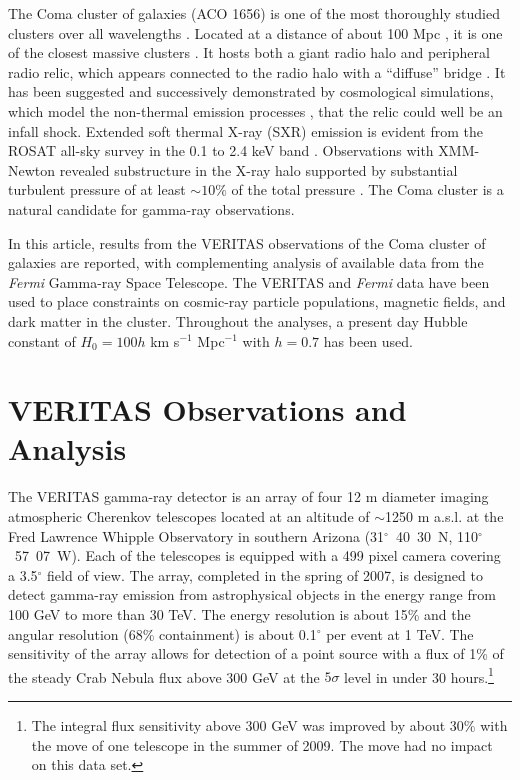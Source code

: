 \documentclass[12pt,manuscript]{aastex}
\def\Fermi{{\em Fermi}\xspace}
\begin{document}
The Coma cluster of galaxies (ACO 1656) is one of the most thoroughly studied clusters over all
wavelengths \citep{article:Voges_etal:1999}. Located at a distance of about 100 Mpc
\citep[$z=0.023$;][]{article:StrubleRood:1999}, it is one of the closest massive clusters \citep[$M
\sim10^{15}M_{\odot}$;][]{article:Smith:1983, article:Kubo_etal:2008}. It hosts both a giant radio
halo \citep{article:Giovannini_etal:1993,article:Thierbach_etal:2003} and peripheral radio relic,
which appears connected to the radio halo with a ``diffuse'' bridge \citep[see discussion
in][]{article:BrownRudnick:2010}. It has been suggested \citep{article:Ensslin_etal:1998} and
successively demonstrated by cosmological simulations, which model the non-thermal emission
processes \citep{article:PfrommerEnsslinSpringel:2008, article:Pfrommer:2008,
article:Battaglia_etal:2009, article:Skillman_etal:2011}, that the relic could well be an infall
shock. Extended soft thermal X-ray (SXR) emission is evident from the ROSAT all-sky survey in the
0.1 to 2.4 keV band \citep{article:BrielHenryBohringer:1992}. Observations with XMM-Newton
\citep{article:Briel_etal:2001} revealed substructure in the X-ray halo supported by substantial
turbulent pressure of at least $\sim 10 \%$ of the total pressure
\citep{article:Schuecker_etal:2004}. The Coma cluster is a natural candidate for gamma-ray
observations.

In this article, results from the VERITAS observations of the Coma cluster of galaxies are
reported, with complementing analysis of available data from the \Fermi Gamma-ray Space Telescope.
The VERITAS and \Fermi data have been used to place constraints on cosmic-ray particle populations,
magnetic fields, and dark matter in the cluster. Throughout the analyses, a present day Hubble
constant of $H_{0} = 100h$ km s$^{-1}$ Mpc$^{-1}$ with $h=0.7$ has been used.

%
%

\section{VERITAS Observations and Analysis}
The VERITAS gamma-ray detector \citep{article:Weekes_etal:2002} is an array of four 12 m diameter
imaging atmospheric Cherenkov telescopes \citep{article:Holder_etal:2006} located at an
altitude of $\sim$1250 m a.s.l. at the Fred Lawrence Whipple Observatory in southern Arizona
(31$^{\circ}$~40\arcmin~30\arcsec~N, 110$^{\circ}$~57\arcmin~07\arcsec~W). Each of the telescopes
is equipped with a 499 pixel camera covering a 3.5$^{\circ}$ field of view. The array, completed in
the spring of 2007, is designed to detect gamma-ray emission from astrophysical objects in the
energy range from 100 GeV to more than 30 TeV. The energy resolution is about 15\% and the angular
resolution (68\% containment) is about 0.1$^{\circ}$ per event at 1 TeV. The sensitivity of the
array allows for detection of a point source with a flux of 1\% of the steady Crab Nebula flux
above 300 GeV at the $5\sigma$ level in under 30 hours.\footnote{The integral flux sensitivity
above 300 GeV was improved by about 30\% with the move of one telescope in the summer of 2009. The
move had no impact on this data set.}
\end{document}
